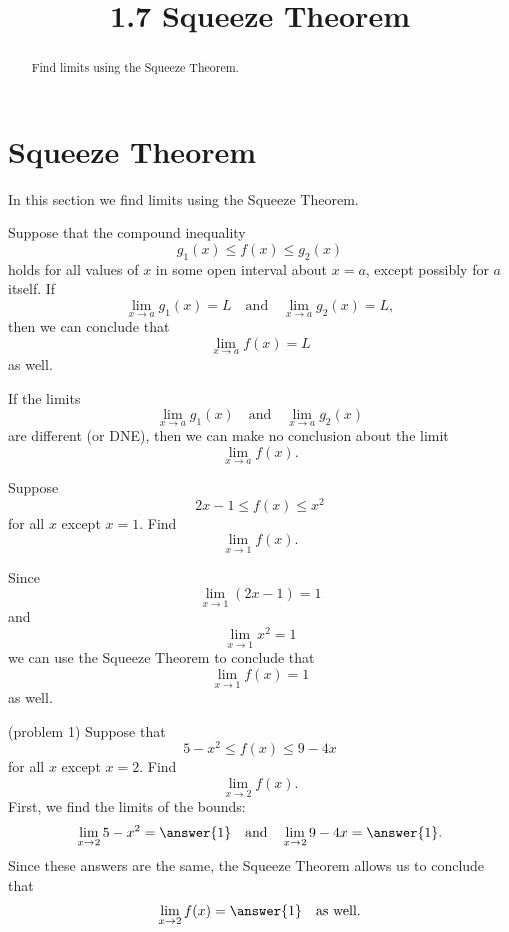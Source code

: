 \documentclass[handout]{ximera}
\title{1.7 Squeeze Theorem}
\begin{document}
\begin{abstract}
Find limits using the Squeeze Theorem.
\end{abstract}

\maketitle

\section{Squeeze Theorem}
 

In this section we find limits using the Squeeze Theorem.

\begin{theorem} 
Suppose that the compound inequality
\[
g_1(x) \leq f(x) \leq g_2(x)
\]
holds for all values of $x$ in some open interval about $x=a$, except possibly for $a$ itself.
If
\[
\lim_{x\to a} g_1(x) = L \quad \text{and} \quad \lim_{x\to a} g_2(x) = L,
\]
then we can conclude that
\[
\lim_{x\to a} f(x) = L
\]
as well.

\end{theorem}


\begin{remark}
If the limits
\[
\lim_{x\to a} g_1(x)  \quad \text{and} \quad \lim_{x\to a} g_2(x)
\]
are different (or DNE), then we can make no conclusion about the limit
\[
\lim_{x\to a} f(x).
\]
\end{remark}

\begin{example}[example 1]
Suppose 
\[
 2x-1 \leq f(x) \leq x^2
\]
for all $x$ except $x=1$.
Find
\[
\lim_{x\to 1} f(x).
\]

Since
\[
\lim_{x\to 1} (2x-1) = 1
\]
and
\[
\lim_{x\to 1} x^2 = 1
\]
we can use the Squeeze Theorem to conclude that
\[
\lim_{x\to 1} f(x) = 1
\]
as well.

\end{example}

\begin{problem}(problem 1)
Suppose that 
\[
 5-x^2\leq f(x) \leq 9-4x
\]
for all $x$ except $x=2$.
Find
\[
\lim_{x\to 2} f(x).
\]
First, we find the limits of the bounds:
\[
\lim_{x \to 2} 5 - x^2 = \answer{1} \quad \text{and} \quad  \lim_{x \to 2} 9-4x = \answer{1}.
\]
Since these answers are the same, the Squeeze Theorem allows us to conclude that 
\[
\lim_{x \to 2} f(x) = \answer{1} \quad \text{as well}.
\]

\end{problem}
\end{document}
